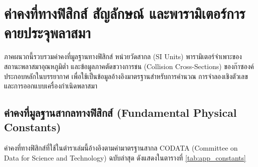 
\chapter{ค่าคงที่ทางฟิสิกส์ สัญลักษณ์ และพารามิเตอร์การคายประจุพลาสมา}
\label{app:physical_constants}

ภาคผนวกนี้รวบรวมค่าคงที่มูลฐานทางฟิสิกส์ หน่วยวัดสากล (SI Units) พารามิเตอร์จำเพาะของสถานะพลาสมาอุณหภูมิต่ำ และข้อมูลภาคตัดขวางการชน (Collision Cross-Sections) ของก๊าซองค์ประกอบหลักในบรรยากาศ เพื่อใช้เป็นข้อมูลอ้างอิงมาตรฐานสำหรับการคำนวณ การจำลองเชิงตัวเลข และการออกแบบเครื่องกำเนิดพลาสมา

\section{ค่าคงที่มูลฐานสากลทางฟิสิกส์ (Fundamental Physical Constants)}
\label{app:sec_constants}

ค่าคงที่ทางฟิสิกส์ที่ใช้ในตำราเล่มนี้อ้างอิงตามค่ามาตรฐานสากล CODATA (Committee on Data for Science and Technology) ฉบับล่าสุด ดังแสดงในตารางที่ \ref{tab:app_constants}

